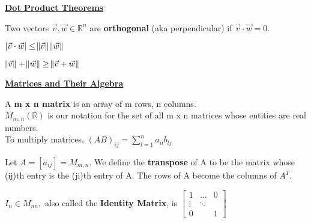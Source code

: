\documentclass{article}
\begin{document}
    \textbf{\underline{Dot Product Theorems}}
    
    \begin{definition}
    Two vectors $\vec{v}, \vec{w} \in \mathbb{R}^n$ are \textbf{orthogonal} (aka perpendicular) if $\vec{v} \cdot \vec{w} = 0.$
    \end{definition}

    \begin{theorem}
    $|\vec{v} \cdot \vec{w}| \leq \norm{\vec{v}} \norm{\vec{w}}$
    \end{theorem}
    
    \begin{theorem}
    $\norm{\vec{v}} + \norm{\vec{w}} \geq \norm{\vec{v} + \vec{w}}$
    \end{theorem} 
    
    \newpage
    
    \textbf{\underline{Matrices and Their Algebra}}
    \begin{definition}
    A \textbf{m x n matrix} is an array of m rows, n columns. \\
    $M_{m,n} (\mathbb{R})$ is our notation for the set of all m x n matrices whose entities are real numbers. \\
    
    To multiply matrices, $(AB)_{ij} = \sum\limits_{l=1}^n a_{il}b_{lj} $
    \end{definition}
    
    \begin{definition}
    Let $A = [a_{ij}] = M_{m, n}.$ We define the \textbf{transpose} of A to be the matrix whose (ij)th entry is the (ji)th entry of A. The rows of A become the columns of $A^{T}.$
    \end{definition}
    
    \begin{definition}
    $I_n \in M_{nn},$ also called the \textbf{Identity Matrix}, is $
 \begin{bmatrix} 
    1 & \dots & 0 \\
    \vdots & \ddots & \\
    0 &        & 1 
    \end{bmatrix}$
    \end{definition}
    
\end{document}
